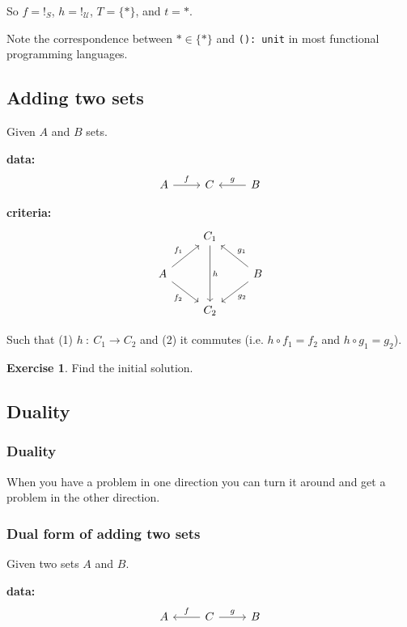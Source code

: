 \documentclass[a4paper, 12pt]{article}
\theoremstyle{definition}
\newtheorem{exercise}{Exercise}
\begin{document}
So $f = !_S$, $h = !_{\mathcal{U}}$, $T = \{ \ast \}$, and $t = \ast$.

Note the correspondence between $\ast \in \{ \ast \}$ and \texttt{(): unit} in
most functional programming languages.

\subsection{Adding two sets}

Given $A$ and $B$ sets.

\textbf{data:}
$$
\begin{tikzcd}
    A \arrow[r, "f"] & C & B \arrow[l, swap, "g"]
\end{tikzcd}
$$

\textbf{criteria:}
$$
\begin{tikzcd}
    {} & C_1 \arrow[dd, "h"] & {} \\
    A \arrow[ru, "f_1"] \arrow[rd, swap, "f_2"]
    & {}
    &
    B \arrow[lu, swap, "g_1"] \arrow[ld, "g_2"]
    \\
    {} & C_2 & {}
\end{tikzcd}
$$

Such that (1) $h\ :\ C_1 \rightarrow C_2$ and (2) it commutes (i.e. $h \circ f_1 = f_2$
and $h \circ g_1 = g_2$).

\begin{exercise}
    Find the initial solution.
\end{exercise}

\subsection{Duality}

\subsubsection*{Duality}
When you have a problem in one direction you can turn it around and get a
problem in the other direction.

\subsubsection*{Dual form of adding two sets}

Given two sets $A$ and $B$.

\textbf{data:}
$$
\begin{tikzcd}
    A & C \arrow[l, swap, "f"] \arrow[r, "g"] & B
\end{tikzcd}
$$
\end{document}
